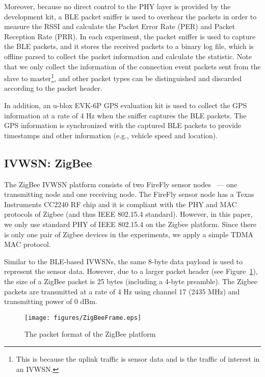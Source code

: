 \documentclass[journal]{IEEEtran}
\begin{document}
Moreover, because no direct control to the PHY layer is provided by the development kit, a BLE packet sniffer is used to overhear the packets in order to measure the RSSI and calculate the Packet Error Rate (PER) and Packet Reception Rate (PRR). 
In each experiment, the packet sniffer is used to capture the BLE packets, and it stores the received packets to a binary log file, which is offline parsed to collect the packet information and calculate the statistic. Note that we only collect the information of the connection event packets sent from the slave to master\footnote{This is because the uplink traffic is sensor data and is the traffic of interest in an IVWSN.}, and other packet types can be distinguished and discarded according to the packet header.





In addition, an u-blox EVK-6P GPS evaluation kit is used to collect the GPS information at a rate of 4 Hz when the sniffer captures the BLE packets. The GPS information is synchronized with the captured BLE packets to provide timestamps and other information (e.g., vehicle speed and location).





\subsection{IVWSN: ZigBee}
The ZigBee IVWSN platform consists of two FireFly sensor nodes~\cite{FireFly} --- one transmitting node and one receiving node. The FireFly sensor node has a Texas Instruments CC2240 RF chip and it is compliant with the PHY and MAC protocols of Zigbee (and thus IEEE 802.15.4 standard). However, in this paper, we only use standard PHY of IEEE 802.15.4 on the Zigbee platform. Since there is only one pair of Zigbee devices in the experiments, we apply a simple TDMA MAC protocol.  




Similar to the BLE-based IVWSNs, the same 8-byte data payload is used to represent the sensor data. However, due to a larger packet header (see Figure~\ref{ZigBeeFrameFormat}), the size of a ZigBee packet is 25 bytes (including a 4-byte preamble). The Zigbee packets are transmitted at a rate of 4 Hz using channel 17 (2435 MHz) and transmitting power of 0 dBm.

\begin{figure}[tbp]
\centering
\texttt{[image: figures/ZigBeeFrame.eps]}
\caption{The packet format of the ZigBee platform}
\label{ZigBeeFrameFormat}
\end{figure}
\end{document}
